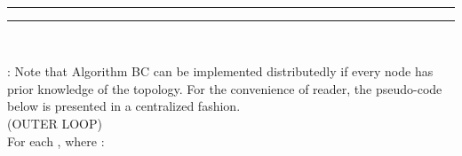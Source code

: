 \documentclass[letterpaper, 11pt]{article}
\begin{document}
~

\hrule

\vspace*{2pt}


\vspace*{4pt}

\hrule

\vspace*{4pt}

~

: Note that Algorithm BC can be implemented distributedly if every node has prior knowledge of the topology. For the convenience of reader, the pseudo-code below is presented in a centralized fashion. \\


\noindent
(OUTER LOOP)\\ For each , where :
\end{document}
